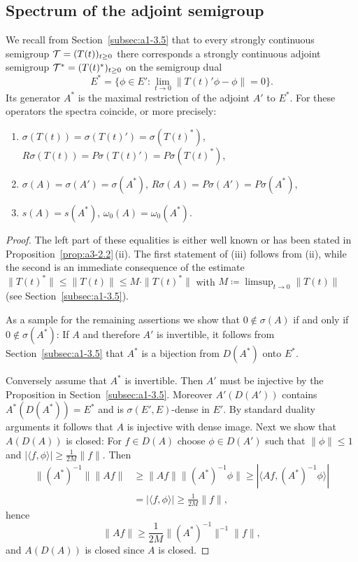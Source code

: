 \subsection{Spectrum of the adjoint semigroup}\label{subsec:a3-4.4}%
We recall from Section~\ref{subsec:a1-3.5} that to every strongly continuous semigroup $\TT = (T(t))_{t \geq 0}$ there corresponds a strongly continuous adjoint semigroup $\TT^{*} = (T(t)^{*})_{t \geq 0}$ on the semigroup dual
\[
E^{*} = \{\phi \in E' \colon \lim_{t \to 0} \|T(t)'\phi-\phi\| = 0\} .
\]
Its generator $A^{*}$ is the maximal restriction of the adjoint $A'$ to $E^{*}$.
For these operators the spectra coincide, or more precisely:
\begin{enumerate}[\upshape (i)]
\item 
$\sigma(T(t)) = \sigma(T(t)') = \sigma(T(t)^{*})$, \\
$R\sigma(T(t)) = P\sigma(T(t)') = P\sigma(T(t)^{*})$, 

\item 
$\sigma(A) = \sigma(A') = \sigma(A^{*})$, $R\sigma(A) = P\sigma(A') = P\sigma(A^{*})$, 
\item 
$s(A) = s(A^{*})$, $\omega_{0}(A) = \omega_{0}(A^{*})$. 
\end{enumerate}
\begin{proof}
The left part of these equalities is either well known or has been stated in 
Proposition~\ref{prop:a3-2.2}\,(ii).
The first statement of (iii) follows from (ii), while the second is an immediate consequence of the estimate $\|T(t)^{*}\| \leq \|T(t)\| \leq M\cdot\|T(t)^{*}\|$ with $M \coloneq \limsup_{t \to 0} \|T(t)\|$ (see Section~\ref{subsec:a1-3.5}).

As a sample for the remaining assertions we show that $0 \notin \sigma(A)$ if and only if\/ $0 \notin \sigma(A^{*})$:
If\/ $A$ and therefore $A'$ is invertible, it follows from Section~\ref{subsec:a1-3.5} that $A^{*}$ is a bijection from $D(A^{*})$ onto $E^{*}$.

Conversely assume that $A^{*}$ is invertible.
Then $A'$ must be injective by the Proposition in Section~\ref{subsec:a1-3.5}.
Moreover $A'(D(A'))$ contains $A^{*}(D(A^{*})) = E^{*}$ and is $\sigma(E',E)$-dense in $E'$.
By standard duality arguments it follows that $A$ is injective with dense image.
Next we show that $A(D(A))$ is closed: For $f \in D(A)$ choose $\phi \in D(A')$ such that $\|\phi\| \leq 1$ and $|\langle f,\phi \rangle| \geq \frac{1}{2M}\|f\|$.
Then
\begin{align*}
\|(A^{*})^{-1}\| \|Af\| &\geq \|Af\| \|(A^{*})^{-1}\phi\| \geq |\langle Af,(A^{*})^{-1}\phi \rangle| \\
&= |\langle f,\phi \rangle| \geq \frac{1}{2M}\|f\| ,
\end{align*}
hence
\[
\|Af\| \geq \frac{1}{2M}\|(A^{*})^{-1}\|^{-1}\|f\| ,
\]
and $A(D(A))$ is closed since $A$ is closed.
\end{proof}
